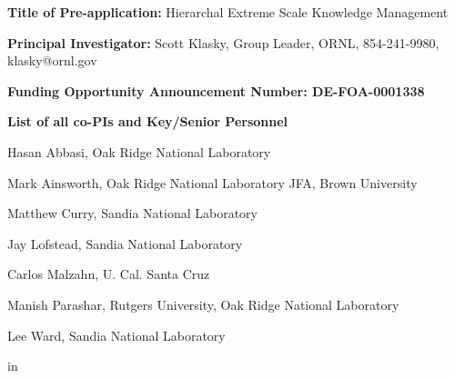 \documentclass[11pt,letterpaper]{article}
\begin{document}

% 









%

{\bf Title of Pre-application:} Hierarchal Extreme Scale Knowledge Management \par
{\bf Principal Investigator:} Scott Klasky, Group Leader, ORNL, 854-241-9980, klasky@ornl.gov \par
{\bf Funding Opportunity Announcement Number: DE-FOA-0001338} \par
{\bf List of all co-PIs and Key/Senior Personnel} \par
Hasan Abbasi, Oak Ridge National Laboratory \par
Mark Ainsworth, Oak Ridge National Laboratory JFA, Brown University \par
Matthew Curry, Sandia National Laboratory\par
Jay Lofstead, Sandia National Laboratory \par
Carlos Malzahn, U. Cal. Santa Cruz \par
Manish Parashar, Rutgers University, Oak Ridge National Laboratory \par
Lee Ward, Sandia National Laboratory \par
{} in
\end{document}
